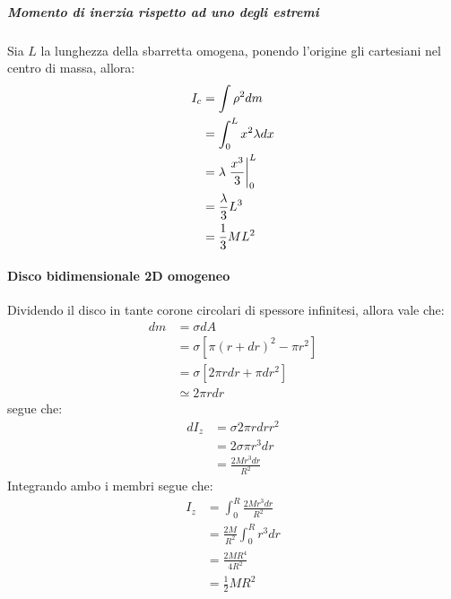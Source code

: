 \documentclass[11pt, a4paper, openright]{book}
\theoremstyle{plain}
\theoremstyle{definition}
\begin{document}
\subparagraph{Momento di inerzia rispetto ad uno degli estremi}
Sia $L$ la lunghezza della sbarretta omogena, ponendo l'origine gli cartesiani nel centro di massa, allora:
\begin{align}
    I_c & = \int \rho^2dm \\ 
    & = \int_{0}^{L} x^2 \lambda dx \\
    & = \lambda \eval{\frac{x^3}{3}}_{0}^{L} \\
    & = \frac{\lambda}{3}L^3 \\
    & = \frac{1}{3}ML^2
\end{align}

\paragraph{Disco bidimensionale 2D omogeneo}
Dividendo il disco in tante corone circolari di spessore infinitesi, allora vale che:
\begin{align}
    dm & = \sigma dA \\
    & = \sigma [\pi(r + dr)^2 - \pi r^2] \\
    & = \sigma [2 \pi r dr + \pi dr^2] \\
    & \simeq 2\pi r dr
\end{align}
segue che:
\begin{align}
    dI_z & = \sigma 2\pi r dr r^2 \\
    & = 2 \sigma \pi r^3 dr \\
    & = \frac{2 M r^3 dr}{R^2}
\end{align}
Integrando ambo i membri segue che:
\begin{align}
    I_z & = \int_{0}^{R} \frac{2 M r^3 dr}{R^2} \\
    & = \frac{2M}{R^2} \int_{0}^{R} r^3 dr \\
    & = \frac{2MR^4}{4R^2} \\
    & = \frac{1}{2}MR^2
\end{align}


\newpage
\end{document}
